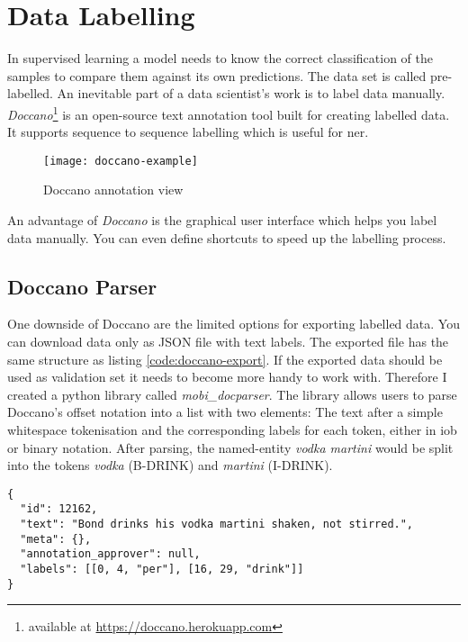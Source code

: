 \section{Data Labelling}

In supervised learning a model needs to know the correct classification of the samples to compare them against its own predictions. The data set is called pre-labelled. An inevitable part of a data scientist's work is to label data manually. \emph{Doccano}\footnote{available at \url{https://doccano.herokuapp.com}} is an open-source text annotation tool built for creating labelled data. It supports sequence to sequence labelling which is useful for \acrlong{ner}.

\begin{figure}[!ht]
    \centering
    \texttt{[image: doccano-example]}
    \caption{Doccano annotation view}
    \label{fig:doccano-example}
\end{figure}

An advantage of \emph{Doccano} is the graphical user interface which helps you label data manually. You can even define shortcuts to speed up the labelling process.

\subsection{Doccano Parser}

One downside of Doccano are the limited options for exporting labelled data. You can download data only as JSON file with text labels. The exported file has the same structure as listing \ref{code:doccano-export}. If the exported data should be used as validation set it needs to become more handy to work with. Therefore I created a python library called \emph{mobi\_docparser}. The library allows users to parse Doccano's offset notation into a list with two elements: The text after a simple whitespace tokenisation and the corresponding labels for each token, either in \acrshort{iob} or binary notation. After parsing, the named-entity \emph{vodka martini} would be split into the tokens \emph{vodka} (B-DRINK) and \emph{martini} (I-DRINK).

\begin{lstlisting}[label={code:doccano-export}, caption=Sample export from Doccano as JSON (text labels)]
{
  "id": 12162,
  "text": "Bond drinks his vodka martini shaken, not stirred.",
  "meta": {},
  "annotation_approver": null,
  "labels": [[0, 4, "per"], [16, 29, "drink"]]
}
\end{lstlisting}

